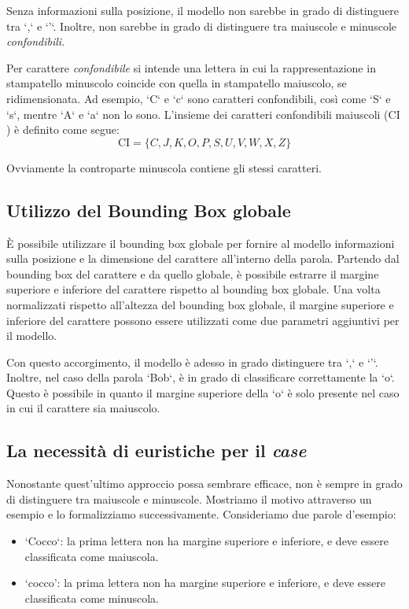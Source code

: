 Senza informazioni sulla posizione, il modello non sarebbe in grado di distinguere tra `,` e `'`. Inoltre, non sarebbe in grado di distinguere tra maiuscole e minuscole \emph{confondibili}.
\newline

Per carattere \emph{confondibile} si intende una lettera in cui la rappresentazione in stampatello minuscolo coincide con quella in stampatello maiuscolo, se ridimensionata. Ad esempio, `C` e `c` sono caratteri confondibili, così come `S` e `s`, mentre `A` e `a` non lo sono.
L'insieme dei caratteri confondibili maiuscoli ($\text{CI}$) è definito come segue:
$$\text{CI} = \{C, J, K, O, P, S, U, V, W, X, Z\}$$

Ovviamente la controparte minuscola contiene gli stessi caratteri.

\subsection{Utilizzo del Bounding Box globale}

È possibile utilizzare il bounding box globale per fornire al modello informazioni sulla posizione e la dimensione del carattere all'interno della parola. Partendo dal bounding box del carattere e da quello globale, è possibile estrarre il margine superiore e inferiore del carattere rispetto al bounding box globale. Una volta normalizzati rispetto all'altezza del bounding box globale, il margine superiore e inferiore del carattere possono essere utilizzati come due parametri aggiuntivi per il modello.

Con questo accorgimento, il modello è adesso in grado distinguere tra `,` e `'`. Inoltre, nel caso della parola `Bob`, è in grado di classificare correttamente la `o`. Questo è possibile in quanto il margine superiore della `o` è solo presente nel caso in cui il carattere sia maiuscolo.

\subsection{La necessità di euristiche per il \emph{case}}

Nonostante quest'ultimo approccio possa sembrare efficace, non è sempre in grado di distinguere tra maiuscole e minuscole.
Mostriamo il motivo attraverso un esempio e lo formalizziamo successivamente.
Consideriamo due parole d'esempio:
\begin{itemize}
	\item `Cocco`: la prima lettera non ha margine superiore e inferiore, e deve essere classificata come maiuscola.
	\item `cocco': la prima lettera non ha margine superiore e inferiore, e deve essere classificata come minuscola.
\end{itemize}

